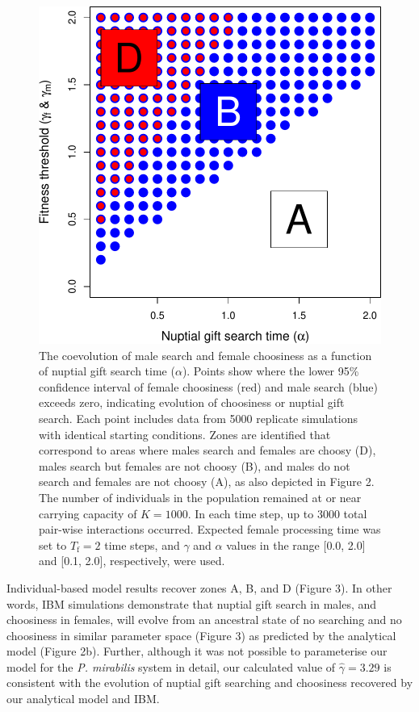 \documentclass[
]{article}
\begin{document}
\begin{figure}
\centering
\includegraphics{ms_files/figure-latex/unnamed-chunk-4-1.pdf}
\caption{The coevolution of male search and female choosiness as a
function of nuptial gift search time (\(\alpha\)). Points show where the
lower 95\% confidence interval of female choosiness (red) and male
search (blue) exceeds zero, indicating evolution of choosiness or
nuptial gift search. Each point includes data from 5000 replicate
simulations with identical starting conditions. Zones are identified
that correspond to areas where males search and females are choosy (D),
males search but females are not choosy (B), and males do not search and
females are not choosy (A), as also depicted in Figure 2. The number of
individuals in the population remained at or near carrying capacity of
\(K = 1000\). In each time step, up to 3000 total pair-wise interactions
occurred. Expected female processing time was set to
\(T_{\mathrm{f}}=2\) time steps, and \(\gamma\) and \(\alpha\) values in
the range {[}0.0, 2.0{]} and {[}0.1, 2.0{]}, respectively, were used.}
\end{figure}

Individual-based model results recover zones A, B, and D (Figure 3). In
other words, IBM simulations demonstrate that nuptial gift search in
males, and choosiness in females, will evolve from an ancestral state of
no searching and no choosiness in similar parameter space (Figure 3) as
predicted by the analytical model (Figure 2b). Further, although it was
not possible to parameterise our model for the \emph{P. mirabilis}
system in detail, our calculated value of \(\hat{\gamma} = 3.29\) is
consistent with the evolution of nuptial gift searching and choosiness
recovered by our analytical model and IBM.
\end{document}
